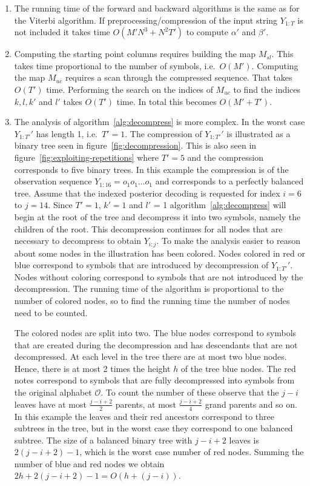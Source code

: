 \begin{enumerate}
\item The running time of the forward and backward algorithms is the same as
  for the Viterbi algorithm. If preprocessing/compression of the input string
  $Y_{1:T}$ is not included it takes time $O(M' N^3 + N^2 T')$ to compute
  $\alpha'$ and $\beta'$.

\item Computing the starting point columns requires building the map $M_{sl}$.
  This takes time proportional to the number of symbols, i.e.\ $O(M')$.
  Computing the map $M_{uc}$ requires a scan through the compressed
  sequence. That takes $O(T')$ time.
  Performing the search on the indices of $M_{uc}$ to find the indices
  $k, l, k'$ and $l'$ takes $O(T')$ time. In total this becomes
  $O(M' + T')$.

\item The analysis of algorithm~\ref{alg:decompress} is more complex. In the
  worst case $Y_{1:T'}'$ has length 1, i.e.\ $T' = 1$. The compression of
  $Y_{1:T'}'$ is illustrated as a binary tree seen in
  figure~\ref{fig:decompression}. This is also seen in
  figure~\ref{fig:exploiting-repetitions} where $T' = 5$ and the compression
  corresponds to five binary trees. In this example the compression is
  of the observation sequence $Y_{1:16} = o_1o_1\dots{}o_1$ and corresponds to a
  perfectly balanced tree. Assume that the indexed posterior decoding is
  requested for index $i = 6$ to $j = 14$. Since $T' = 1$, $k' = 1$ and $l'$ =
  1 algorithm~\ref{alg:decompress} will begin at the root of the tree and
  decompress it into two symbols, namely the children of the root. This
  decompression continues for all nodes that are necessary to decompress to
  obtain $Y_{i:j}$. To make the analysis easier to reason about some
  nodes in the illustration has been colored. Nodes colored in red or blue correspond to
  symbols that are introduced by decompression of $Y_{1:T'}'$. Nodes without
  coloring correspond to symbols that are not introduced by the decompression. The running time of the
  algorithm is proportional to the number of colored nodes, so to find the
  running time the number of nodes need to be counted.

  The colored nodes are split into two. The blue nodes correspond to symbols
  that are created during the decompression and has descendants that are not
  decompressed. At each level in the tree there are at most two blue nodes.
  Hence, there is at most 2 times the height $h$ of the tree blue nodes. The
  red notes correspond to symbols that are fully decompressed into symbols from
  the original alphabet $\mathcal{O}$. To count the number of these observe
  that the $j - i$ leaves have at most $\frac{j - i + 2}{2}$ parents, at most
  $\frac{j - i + 2}{4}$ grand parents and so on. In this example the leaves and
  their red ancestors correspond to three subtrees in the tree, but in the
  worst case they correspond to one balanced subtree. The size of a balanced
  binary tree with $j - i + 2$ leaves is $2(j - i + 2) - 1$, which is the worst
  case number of red nodes. Summing the number of blue and red nodes we obtain
  $2h + 2(j - i + 2) - 1 = O(h + (j - i))$.


\end{enumerate}
